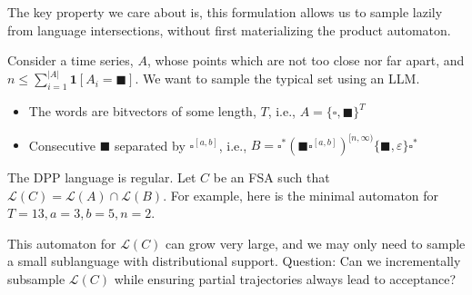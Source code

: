 \documentclass[portrait,a0b,final,a4resizeable]{a0poster}
\def\jointspacing{\vspace{0.3in}}
\newcommand{\bs}{\blacksquare}
\newcommand{\ws}{\square}
\begin{document}
\begin{poster}
\begin{multicols}{2}
    \hspace*{2cm}\begin{minipage}[c]{0.90\columnwidth}
    The key property we care about is, this formulation allows us to sample lazily from language intersections, without first materializing the product automaton.
    \end{minipage}

    \jointspacing


      \jointspacing

      \hspace*{2cm}\begin{minipage}[c]{0.90\columnwidth}
      Consider a time series, $A$, whose points which are not too close nor far apart, and $n \leq \sum_{i=1}^{|A|} \mathbf{1}[A_i = \bs]$. We want to sample the typical set using an LLM.\vspace{0.5cm}
\begin{itemize}[leftmargin=2cm]
\item The words are bitvectors of some length, $T$, i.e., $A = \{\ws, \bs\}^T$
\item Consecutive $\bs$ separated by $\ws^{[a,b]}$, i.e., $B = \ws^*(\bs\ws^{[a, b]})^{[n,\infty)}\{\bs,\varepsilon\}\ws^*$
\end{itemize}\vspace{0.5cm}

The DPP language is regular. Let $C$ be an FSA such that $\mathcal{L}(C) = \mathcal{L}(A) \cap \mathcal{L}(B)$. For example, here is the minimal automaton for $T=13, a=3, b=5, n=2$.
      \end{minipage}

\jointspacing

\hspace{5cm}

\jointspacing

      \hspace*{2cm}\begin{minipage}[c]{0.90\columnwidth}
This automaton for $\mathcal{L}(C)$ can grow very large, and we may only need to sample a small sublanguage with distributional support.
Question: Can we incrementally subsample $\mathcal{L}(C)$ while ensuring partial trajectories always lead to acceptance?
\vspace{2cm}
      \end{minipage}

      \jointspacing


\end{multicols}
\end{poster}
\end{document}
